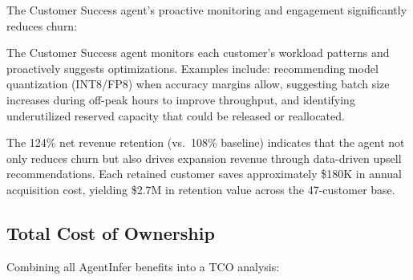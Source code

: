 \documentclass[conference,10pt,letterpaper]{IEEEtran}
\begin{document}
The Customer Success agent's proactive monitoring and engagement significantly reduces churn:

\begin{table}[!t]
\caption{Customer Retention Metrics}
\label{tab:retention}
\centering\scriptsize
{}
\end{table}

The Customer Success agent monitors each customer's workload patterns and proactively suggests optimizations. Examples include: recommending model quantization (INT8/FP8) when accuracy margins allow, suggesting batch size increases during off-peak hours to improve throughput, and identifying underutilized reserved capacity that could be released or reallocated.

The 124\% net revenue retention (vs.\ 108\% baseline) indicates that the agent not only reduces churn but also drives expansion revenue through data-driven upsell recommendations. Each retained customer saves approximately \$180K in annual acquisition cost, yielding \$2.7M in retention value across the 47-customer base.

\subsection{Total Cost of Ownership}

Combining all AgentInfer benefits into a TCO analysis:
\end{document}
